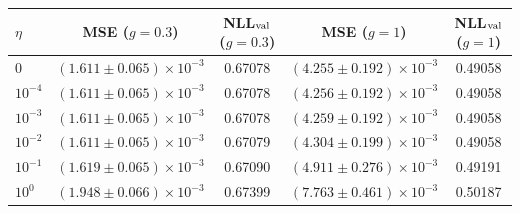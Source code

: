 \begin{tabular}{lcccc}
\hline\hline
$\eta$ & MSE ($g=0.3$) & NLL$_{\rm val}$ ($g=0.3$) & MSE ($g=1$) & NLL$_{\rm val}$ ($g=1$)\\
\hline
0 & $(1.611\pm0.065){\times}10^{-3}$ & 0.67078 & $(4.255\pm0.192){\times}10^{-3}$ & 0.49058\\
$10^{-4}$ & $(1.611\pm0.065){\times}10^{-3}$ & 0.67078 & $(4.256\pm0.192){\times}10^{-3}$ & 0.49058\\
$10^{-3}$ & $(1.611\pm0.065){\times}10^{-3}$ & 0.67078 & $(4.259\pm0.192){\times}10^{-3}$ & 0.49058\\
$10^{-2}$ & $(1.611\pm0.065){\times}10^{-3}$ & 0.67079 & $(4.304\pm0.199){\times}10^{-3}$ & 0.49058\\
$10^{-1}$ & $(1.619\pm0.065){\times}10^{-3}$ & 0.67090 & $(4.911\pm0.276){\times}10^{-3}$ & 0.49191\\
$10^{0}$ & $(1.948\pm0.066){\times}10^{-3}$ & 0.67399 & $(7.763\pm0.461){\times}10^{-3}$ & 0.50187\\
\hline\hline
\end{tabular}
